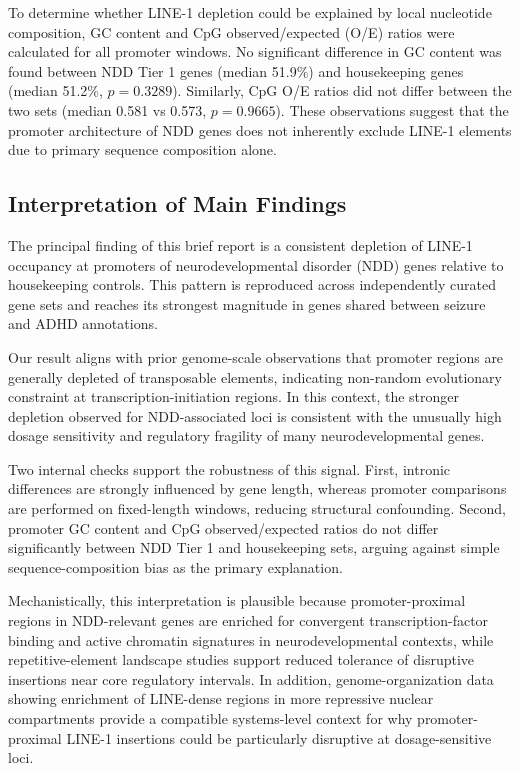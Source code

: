 \documentclass[preprints,briefreport,submit,pdftex,oneauthor]{Definitions/mdpi}
\begin{document}
To determine whether LINE-1 depletion could be explained by local nucleotide composition, GC content and CpG observed/expected (O/E) ratios were calculated for all promoter windows. No significant difference in GC content was found between NDD Tier 1 genes (median 51.9\%) and housekeeping genes (median 51.2\%, $p = 0.3289$). Similarly, CpG O/E ratios did not differ between the two sets (median 0.581 vs 0.573, $p = 0.9665$). These observations suggest that the promoter architecture of NDD genes does not inherently exclude LINE-1 elements due to primary sequence composition alone.

\subsection{Interpretation of Main Findings}

The principal finding of this brief report is a consistent depletion of LINE-1 occupancy at promoters of neurodevelopmental disorder (NDD) genes relative to housekeeping controls. This pattern is reproduced across independently curated gene sets and reaches its strongest magnitude in genes shared between seizure and ADHD annotations.

Our result aligns with prior genome-scale observations that promoter regions are generally depleted of transposable elements, indicating non-random evolutionary constraint at transcription-initiation regions\cite{simonti2017,you2025}. In this context, the stronger depletion observed for NDD-associated loci is consistent with the unusually high dosage sensitivity and regulatory fragility of many neurodevelopmental genes\cite{zug2022}.

Two internal checks support the robustness of this signal. First, intronic differences are strongly influenced by gene length, whereas promoter comparisons are performed on fixed-length windows, reducing structural confounding. Second, promoter GC content and CpG observed/expected ratios do not differ significantly between NDD Tier 1 and housekeeping sets, arguing against simple sequence-composition bias as the primary explanation.

Mechanistically, this interpretation is plausible because promoter-proximal regions in NDD-relevant genes are enriched for convergent transcription-factor binding and active chromatin signatures in neurodevelopmental contexts\cite{darbandi2024,koesterich2023}, while repetitive-element landscape studies support reduced tolerance of disruptive insertions near core regulatory intervals\cite{liang2015,chuong2016}. In addition, genome-organization data showing enrichment of LINE-dense regions in more repressive nuclear compartments provide a compatible systems-level context for why promoter-proximal LINE-1 insertions could be particularly disruptive at dosage-sensitive loci\cite{lu2020}.
\end{document}
